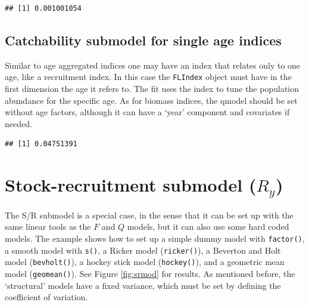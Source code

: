 \documentclass[
]{book}
\newenvironment{Shaded}{\begin{snugshade}}{\end{snugshade}}
\newcommand{\AttributeTok}[1]{\textcolor[rgb]{0.13,0.29,0.53}{#1}}
\newcommand{\CommentTok}[1]{\textcolor[rgb]{0.56,0.35,0.01}{\textit{#1}}}
\newcommand{\ConstantTok}[1]{\textcolor[rgb]{0.56,0.35,0.01}{#1}}
\newcommand{\DecValTok}[1]{\textcolor[rgb]{0.00,0.00,0.81}{#1}}
\newcommand{\FunctionTok}[1]{\textcolor[rgb]{0.13,0.29,0.53}{\textbf{#1}}}
\newcommand{\NormalTok}[1]{#1}
\newcommand{\OtherTok}[1]{\textcolor[rgb]{0.56,0.35,0.01}{#1}}
\newcommand{\SpecialCharTok}[1]{\textcolor[rgb]{0.81,0.36,0.00}{\textbf{#1}}}
\begin{document}
\begin{verbatim}
## [1] 0.001001054
\end{verbatim}

\hypertarget{catchability-submodel-for-single-age-indices}{%
\subsection{Catchability submodel for single age indices}\label{catchability-submodel-for-single-age-indices}}

Similar to age aggregated indices one may have an index that relates only to one age, like a recruitment index. In this case the \texttt{FLIndex} object must have in the first dimension the age it refers to. The fit uses the index to tune the population abundance for the specific age. As for biomass indices, the qmodel should be set without age factors, although it can have a `year' component and covariates if needed.

\begin{Shaded}
\end{Shaded}

\begin{verbatim}
## [1] 0.04751391
\end{verbatim}

\hypertarget{stock-recruitment-submodel-r_y}{%
\section{\texorpdfstring{Stock-recruitment submodel (\(R_y\))}{Stock-recruitment submodel (R\_y)}}\label{stock-recruitment-submodel-r_y}}

The S/R submodel is a special case, in the sense that it can be set up with the same linear tools as the \(F\) and \(Q\) models, but it can also use some hard coded models. The example shows how to set up a simple dummy model with \texttt{factor()}, a smooth model with \texttt{s()}, a Ricker model (\texttt{ricker()}), a Beverton and Holt model (\texttt{bevholt()}), a hockey stick model (\texttt{hockey()}), and a geometric mean model (\texttt{geomean()}). See Figure \ref{fig:srmod} for results. As mentioned before, the `structural' models have a fixed variance, which must be set by defining the coefficient of variation.
\end{document}
